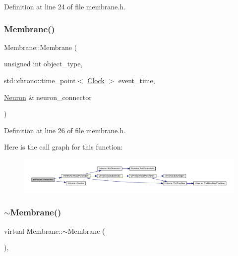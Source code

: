 Definition at line 24 of file membrane.\+h.

\mbox{\label{class_membrane_a8d61894d90a7f63e427cd8b1a5eca380}} 
\subsubsection{\texorpdfstring{Membrane()}{Membrane()}\hspace{0.1cm}{\footnotesize\ttfamily [4/4]}}
{\footnotesize\ttfamily Membrane\+::\+Membrane (\begin{DoxyParamCaption}\item[{unsigned int}]{object\+\_\+type,  }\item[{std\+::chrono\+::time\+\_\+point$<$ \mbox{\hyperlink{universe_8h_a0ef8d951d1ca5ab3cfaf7ab4c7a6fd80}{Clock}} $>$}]{event\+\_\+time,  }\item[{\mbox{\hyperlink{class_neuron}{Neuron}} \&}]{neuron\+\_\+connector }\end{DoxyParamCaption})\hspace{0.3cm}{\ttfamily [inline]}}



Definition at line 26 of file membrane.\+h.

Here is the call graph for this function\+:\nopagebreak
\begin{figure}[H]
\begin{center}
\leavevmode
\includegraphics[width=350pt]{class_membrane_a8d61894d90a7f63e427cd8b1a5eca380_cgraph}
\end{center}
\end{figure}
\mbox{\label{class_membrane_a8765daf8038c1e992e3ea3752db0042f}} 
\subsubsection{\texorpdfstring{$\sim$\+Membrane()}{~Membrane()}}
{\footnotesize\ttfamily virtual Membrane\+::$\sim$\+Membrane (\begin{DoxyParamCaption}{ }\end{DoxyParamCaption})\hspace{0.3cm}{\ttfamily [inline]}, {\ttfamily [virtual]}}


